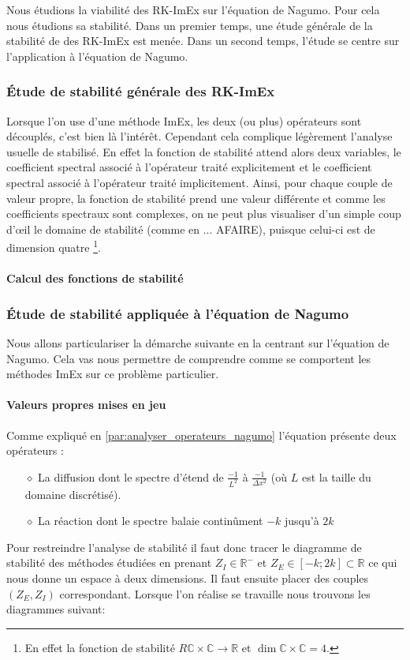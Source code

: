 Nous étudions la viabilité des RK-ImEx sur l'équation de Nagumo. Pour cela nous étudions sa stabilité.
Dans un premier temps, une étude générale de la stabilité de des RK-ImEx est menée.
Dans un second temps, l'étude se centre sur l'application à l'équation de Nagumo.

\subsubsection{Étude de stabilité générale des RK-ImEx}
    Lorsque l'on use d'une méthode ImEx, les deux (ou plus) opérateurs sont découplés, c'est bien là l'intérêt.
    Cependant cela complique légèrement l'analyse usuelle de stabilisé. En effet la fonction de stabilité attend alors deux variables, %
    le coefficient spectral associé à l'opérateur traité explicitement et le coefficient spectral associé à l'opérateur traité implicitement.
    Ainsi, pour chaque couple de valeur propre, la fonction de stabilité prend une valeur différente et comme les coefficients spectraux sont complexes, 
    on ne peut plus visualiser d'un simple coup d'œil le domaine de stabilité (comme en ... AFAIRE), puisque celui-ci est de dimension quatre
    \footnote{En effet la fonction de stabilité $R \mathbb C \times \mathbb C \rightarrow \mathbb R$ et $\dim  \mathbb C \times \mathbb C=4$.}.
    \paragraph{Calcul des fonctions de stabilité}

\subsubsection{Étude de stabilité appliquée à l'équation de Nagumo}
    Nous allons particulariser la démarche suivante en la centrant sur l'équation de Nagumo. Cela vas nous permettre de comprendre 
    comme se comportent les méthodes ImEx sur ce problème particulier.
    \paragraph{Valeurs propres mises en jeu}
        Comme expliqué en \ref{par:analyser_operateurs_nagumo} l'équation présente deux opérateurs : 
        \begin{itemize}
            \item[$\diamond$] La diffusion dont le spectre d'étend de $\frac{-1}{L^2}$ à $\frac{-1}{\Delta x^2}$ (où $L$ est la taille du domaine discrétisé).
            \item[$\diamond$] La réaction dont le spectre balaie continûment $-k$ jusqu'à $2k$
        \end{itemize}
        Pour restreindre l'analyse de stabilité il faut donc tracer le diagramme de stabilité des méthodes étudiées en prenant $Z_I \in \mathbb{R}^-$ 
        et $Z_E \in [-k;2k] \subset \mathbb{R}$ ce qui nous donne un espace à deux dimensions. Il faut ensuite placer des couples $(Z_E,Z_I)$ correspondant.
        Lorsque l'on réalise se travaille nous trouvons les diagrammes suivant: 
        
